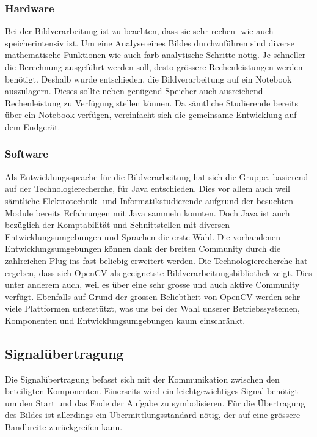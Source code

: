 \subsubsection{Hardware}
Bei der Bildverarbeitung ist zu beachten, dass sie sehr rechen- wie auch speicherintensiv ist. Um eine Analyse eines Bildes durchzuführen sind diverse mathematische Funktionen wie auch farb-analytische Schritte nötig. Je schneller die Berechnung ausgeführt werden soll, desto grössere Rechenleistungen werden benötigt. Deshalb wurde entschieden, die Bildverarbeitung auf ein Notebook auszulagern. Dieses sollte neben genügend Speicher auch ausreichend Rechenleistung zu Verfügung stellen können. Da sämtliche Studierende bereits über ein Notebook verfügen, vereinfacht sich die gemeinsame Entwicklung auf dem Endgerät.

\subsubsection{Software}
Als Entwicklungssprache für die Bildverarbeitung hat sich die Gruppe, basierend auf der Technologierecherche, für Java entschieden. Dies vor allem auch weil sämtliche Elektrotechnik- und Informatikstudierende aufgrund der besuchten Module bereits Erfahrungen mit Java sammeln konnten. Doch Java ist auch bezüglich der Komptabilität und Schnittstellen mit diversen Entwicklungsumgebungen und Sprachen die erste Wahl. Die vorhandenen Entwicklungsumgebungen können dank der breiten Community durch die zahlreichen Plug-ins fast beliebig erweitert werden.
Die Technologierecherche hat ergeben, dass sich OpenCV als geeignetste Bildverarbeitungsbibliothek zeigt. Dies unter anderem auch, weil es über eine sehr grosse und auch aktive Community verfügt. Ebenfalls auf Grund der grossen Beliebtheit von OpenCV werden sehr viele Plattformen unterstützt, was uns bei der Wahl unserer Betriebssystemen, Komponenten und Entwicklungsumgebungen kaum einschränkt.

\subsection{Signalübertragung}
Die Signalübertragung befasst sich mit der Kommunikation zwischen den beteiligten Komponenten. Einerseits wird ein leichtgewichtiges Signal benötigt um den Start und das Ende der Aufgabe zu symbolisieren. Für die Übertragung des Bildes ist allerdings ein Übermittlungsstandard nötig, der auf eine grössere Bandbreite zurückgreifen kann.

